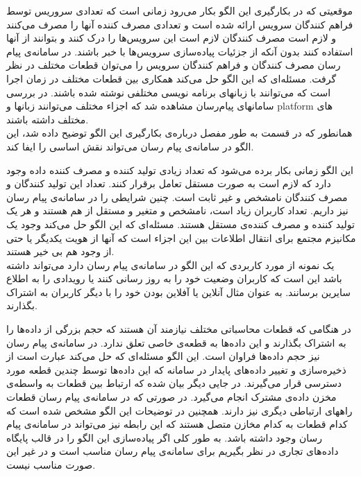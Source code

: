 

موقعیتی که در بکارگیری این الگو بکار می‌رود زمانی است که تعدادی سروریس توسط فراهم کنندگان سرویس ارائه شده است و تعدادی مصرف کننده آنها را مصرف می‌کنند و لازم است مصرف کنندگان لازم است این سرویس‌ها را درک کنند و بتوانند از آنها استفاده کنند بدون آنکه از جزئیات پیاده‌سازی سرویس‌ها با خبر باشند. در سامانه‌ی پیام رسان مصرف کنندگان و فراهم کنندگان سرویس را می‌توان قطعات مختلف در نظر گرفت. مسئله‌ای که این الگو حل می‌کند همکاری بین قطعات مختلف در زمان اجرا است که می‌توانند با زبانهای برنامه نویسی مختلفی نوشته شده باشند. در بررسی سامانهای پیام‌رسان مشاهده شد که اجزاء مختلف می‌توانند زبانها و platform های مختلف داشته باشند. \\
همانطور که در قسمت   به طور مفصل درباره‌ی بکارگیری این الگو توضیح داده شد، این الگو در سامانه‌ی پیام‌ رسان می‌تواند نقش اساسی را ایفا کند.

این الگو زمانی بکار برده می‌شود که تعداد زیادی تولید کننده و مصرف کننده داده وجود دارد که لازم است به صورت مستقل تعامل برقرار کنند. تعداد این تولید کنندگان و مصرف کنندگان نامشخص و غیر ثابت است. چنین شرایطی را در سامانه‌ی پیام رسان نیز داریم. تعداد کاربران زیاد است، نامشخص و متغیر و مستقل از هم هستند و هر یک تولید کننده و مصرف کننده‌ی مستقل هستند. مسئله‌ای که این الگو حل می‌کند وجود یک مکانیزم مجتمع برای انتقال اطلاعات بین این اجزاء است که آنها از هویت یکدیگر یا حتی از وجود هم بی خیر هستند. \\
یک نمونه از مورد کاربردی که این الگو در سامانه‌ی پیام رسان دارد می‌تواند داشته باشد این است که کاربران وضعیت خود را به روز رسانی کنند یا رویدادی را به اطلاع سایرین برسانند. به عنوان مثال آنلاین یا آفلاین بودن خود را با دیگر کاربران به اشتراک بگذارند.

در هنگامی که قطعات   محاسباتی مختلف نیازمند آن هستند که حجم بزرگی از داده‌ها را به اشتراک بگذارند و این داده‌ها به قطعه‌ی خاصی تعلق ندارد. در سامانه‌ی پیام‌ رسان نیز حجم داده‌ها فراوان است. این الگو مسئله‌ای که حل می‌کند عبارت است از ذخیره‌سازی و تغییر داده‌های پایدار در سامانه که این داده‌ها توسط چندین قطعه مورد دسترسی قرار می‌گیرند. در جایی دیگر بیان شده که ارتباط بین قطعات به واسطه‌ی مخزن داده‌ی مشترک  انجام می‌گیرد. در صورتی که در سامانه‌ی پیام رسان قطعات راههای ارتباطی دیگری نیز دارند. همچنین در توضیحات این الگو مشخص شده است که کدام قطعات به کدام مخازن متصل هستند که این رابطه نیز می‌تواند در سامانه‌ی پیام رسان وجود داشته باشد. به طور کلی اگر پیاده‌سازی این الگو را در قالب پایگاه داده‌های تجاری در نظر بگیریم برای سامانه‌ی پیام رسان مناسب است و در غیر این صورت مناسب نیست.








